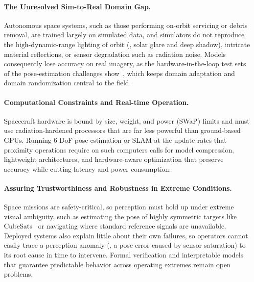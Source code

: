 \paragraph{The Unresolved Sim-to-Real Domain Gap.}
Autonomous space systems, such as those performing on-orbit servicing or debris removal, are trained largely on simulated data, and simulators do not reproduce the high-dynamic-range lighting of orbit (\eg, solar glare and deep shadow), intricate material reflections, or sensor degradation such as radiation noise.
Models consequently lose accuracy on real imagery, as the hardware-in-the-loop test sets of the pose-estimation challenges show~\cite{kisantal2020satellitechallenge,park2022speed+}, which keeps domain adaptation and domain randomization central to the field.

\paragraph{Computational Constraints and Real-time Operation.}
Spacecraft hardware is bound by size, weight, and power (SWaP) limits and must use radiation-hardened processors that are far less powerful than ground-based GPUs.
Running 6-DoF pose estimation or SLAM at the update rates that proximity operations require on such computers calls for model compression, lightweight architectures, and hardware-aware optimization that preserve accuracy while cutting latency and power consumption.

\paragraph{Assuring Trustworthiness and Robustness in Extreme Conditions.}
Space missions are safety-critical, so perception must hold up under extreme visual ambiguity, such as estimating the pose of highly symmetric targets like CubeSats~\cite{musallam2022cubesatcdt} or navigating where standard reference signals are unavailable.
Deployed systems also explain little about their own failures, so operators cannot easily trace a perception anomaly (\eg, a pose error caused by sensor saturation) to its root cause in time to intervene.
Formal verification and interpretable models that guarantee predictable behavior across operating extremes remain open problems.
